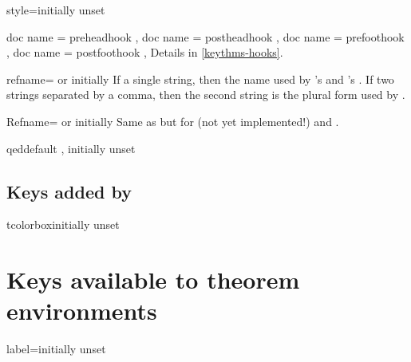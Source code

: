\documentclass{ltxdoc}
\begin{document}
\begin{docKey}{style}{=}{initially unset}

\end{docKey}

\begin{docKeys}[
  doc parameter = {=\meta{code}},
  doc description = initially unset,
  ]
  {
	{ doc name = preheadhook },
	{ doc name = postheadhook },
	{ doc name = prefoothook },
	{ doc name = postfoothook },
  }
Details in \autoref{keythms-hooks}.
\end{docKeys}

\begin{docKey}{refname}{= or }{initially }
If a single string, then the name used by 's  and 's . If two strings separated by a comma, then the second string is the plural form used by .
\end{docKey}

\begin{docKey}{Refname}{= or }{initially }
Same as  but for  (not yet implemented!) and .
\end{docKey}

\begin{docKey}{qed}{}{default , initially unset}

\end{docKey}

\subsection{Keys added by }

\begin{docKey}{tcolorbox}{}{initially unset}

\end{docKey}

\section{Keys available to theorem environments} \label{in-doc-keys}

\begin{docKey}{label}{=}{initially unset}

\end{docKey}
\end{document}
